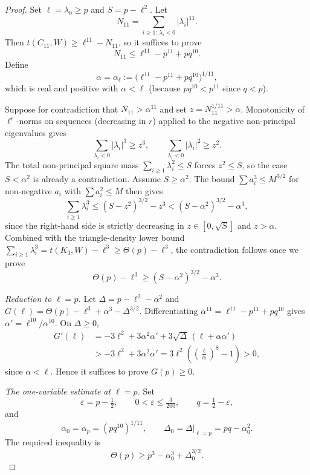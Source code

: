 \documentclass[11pt]{article}
\newcommand{\eps}{\varepsilon}
\begin{document}
\begin{proof}
Set $\ell=\lambda_0\ge p$ and $S=p-\ell^2$.  Let
\[
        N_{11}=\sum_{i\ge1:\,\lambda_i<0}|\lambda_i|^{11}.
\]
Then $t(C_{11},W)\ge\ell^{11}-N_{11}$, so it suffices to prove
\begin{equation}\label{eq:N11-target}
        N_{11}\le\ell^{11}-p^{11}+pq^{10}.
\end{equation}
Define
\[
        \alpha=\alpha_\ell:=\bigl(\ell^{11}-p^{11}+pq^{10}\bigr)^{1/11},
\]
which is real and positive with $\alpha<\ell$ (because $pq^{10}<p^{11}$ since $q<p$).

Suppose for contradiction that $N_{11}>\alpha^{11}$ and set $z=N_{11}^{1/11}>\alpha$.  Monotonicity of $\ell^r$-norms on sequences (decreasing in $r$) applied to the negative non-principal eigenvalues gives
\[
        \sum_{\lambda_i<0}|\lambda_i|^3\ge z^3,
        \qquad
        \sum_{\lambda_i<0}|\lambda_i|^2\ge z^2.
\]
The total non-principal square mass $\sum_{i\ge1}\lambda_i^2\le S$ forces $z^2\le S$, so the case $S<\alpha^2$ is already a contradiction.  Assume $S\ge\alpha^2$.  The bound $\sum a_i^3\le M^{3/2}$ for non-negative $a_i$ with $\sum a_i^2\le M$ then gives
\[
        \sum_{i\ge1}\lambda_i^3
        \le (S-z^2)^{3/2}-z^3
        <(S-\alpha^2)^{3/2}-\alpha^3,
\]
since the right-hand side is strictly decreasing in $z\in[0,\sqrt S]$ and $z>\alpha$.  Combined with the triangle-density lower bound $\sum_{i\ge1}\lambda_i^3=t(K_3,W)-\ell^3\ge\Theta(p)-\ell^3$, the contradiction follows once we prove
\begin{equation}\label{eq:key-ell-C11}
        \Theta(p)-\ell^3\ge(S-\alpha^2)^{3/2}-\alpha^3.
\end{equation}

\smallskip\noindent\emph{Reduction to $\ell=p$.}
Let $\Delta=p-\ell^2-\alpha^2$ and $G(\ell)=\Theta(p)-\ell^3+\alpha^3-\Delta^{3/2}$.  Differentiating $\alpha^{11}=\ell^{11}-p^{11}+pq^{10}$ gives $\alpha'=\ell^{10}/\alpha^{10}$.  On $\Delta\ge0$,
\[
\begin{aligned}
        G'(\ell)
        &=-3\ell^2+3\alpha^2\alpha'+3\sqrt{\Delta}\,(\ell+\alpha\alpha') \\
        &>-3\ell^2+3\alpha^2\alpha'
        =3\ell^2\left(\left(\frac{\ell}{\alpha}\right)^8-1\right)>0,
\end{aligned}
\]
since $\alpha<\ell$.  Hence it suffices to prove $G(p)\ge0$.

\smallskip\noindent\emph{The one-variable estimate at $\ell=p$.}
Set
\[
        \eps=p-\tfrac12,
        \qquad 0<\eps\le\tfrac{3}{200},
        \qquad q=\tfrac12-\eps,
\]
and
\[
        \alpha_0=\alpha_p=(pq^{10})^{1/11},
        \qquad \Delta_0=\Delta|_{\ell=p}=pq-\alpha_0^2.
\]
The required inequality is
\begin{equation}\label{eq:key-p-C11}
        \Theta(p)\ge p^3-\alpha_0^3+\Delta_0^{3/2}.
\end{equation}


\end{proof}
\end{document}

